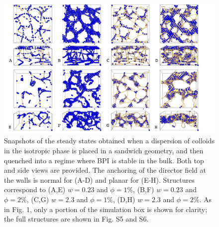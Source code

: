 \documentclass[12pt]{article}
\begin{document}
\begin{figure}
\centerline{\includegraphics[width=\textwidth]{text-fig2.jpg}}
\caption{Snapshots of the steady states obtained when a dispersion of colloids in the isotropic phase is placed in a sandwich geometry, 
and then quenched into a regime where BPI is stable in the bulk. Both top and side views are provided.
The anchoring of the director field at the walls is normal for (A-D) and planar for (E-H). 
Structures correspond to (A,E) $w=0.23$ and $\phi=1\%$, 
(B,F) $w=0.23$ and $\phi=2\%$, 
(C,G) $w=2.3$ and $\phi=1\%$,
(D,H) $w=2.3$ and $\phi=2\%$.
As in Fig. 1, only a portion of the simulation box is shown for clarity;
the full structures are shown in Fig. S5 and S6.}
\end{figure}
\end{document}
